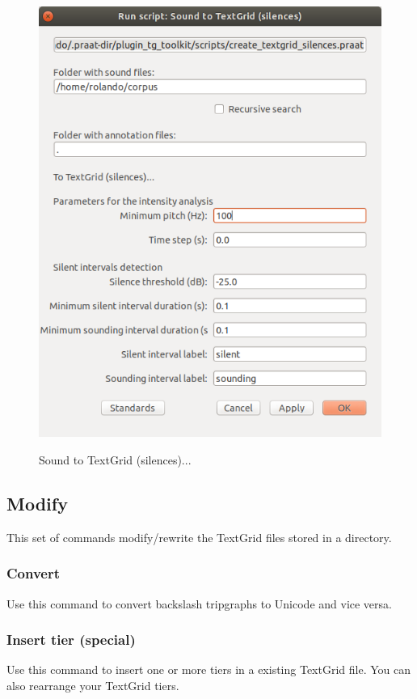 \documentclass[10pt,a4paper]{article}
\begin{document}
\begin{figure}[H]
	\centering
	\includegraphics[scale=0.5]{img/sound2tg_silences}
	\label{fig:sound2tg_silences}
	\caption{Sound to TextGrid (silences)...}
\end{figure}

\subsection{Modify}
This set of commands modify/rewrite the TextGrid files stored in a directory.

\subsubsection{Convert}
Use this command to convert backslash tripgraphs to Unicode and vice versa.

\subsubsection{Insert tier (special)}
Use this command to insert one or more tiers in a existing TextGrid file. You can also rearrange your TextGrid tiers.
\end{document}
